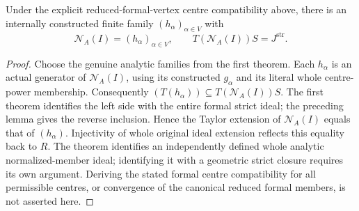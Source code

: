 \begin{theorem}
\label{hir:actual-analytic-normalized-member-finite-generation}
\leanok
Under the explicit reduced-formal-vertex centre compatibility above, there
is an internally constructed finite family $(h_\alpha)_{\alpha\in V}$ with
\[
 \mathcal N_A(I)=(h_\alpha)_{\alpha\in V},\qquad
 T(\mathcal N_A(I))S=J^{\mathrm{str}}.
\]
\end{theorem}
\begin{proof}
Choose the genuine analytic families from the first theorem. Each
$h_\alpha$ is an actual generator of $\mathcal N_A(I)$, using its
constructed $g_\alpha$ and its literal whole centre-power membership.
Consequently $(T(h_\alpha))\subseteq T(\mathcal N_A(I))S$.
The first theorem identifies the left side with the entire formal strict
ideal; the preceding lemma gives the reverse inclusion. Hence the Taylor
extension of $\mathcal N_A(I)$ equals that of $(h_\alpha)$. Injectivity of
whole original ideal extension reflects this equality back to $R$.
The theorem identifies an independently defined whole analytic
normalized-member ideal; identifying it with a geometric strict closure
requires its own argument. Deriving the stated formal centre compatibility
for all permissible centres, or convergence of the canonical reduced formal
members, is not asserted here.
\end{proof}
